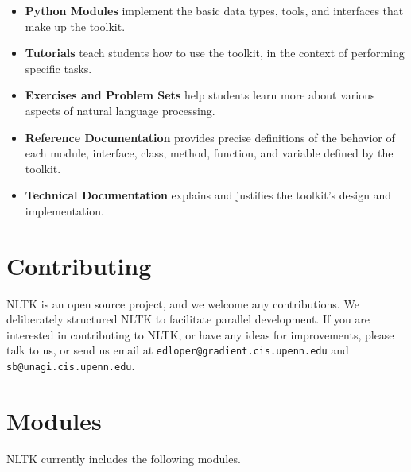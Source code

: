 \documentclass[12pt]{article}
\def\nogap{\setlength\itemsep{.0in}\setlength{\parskip}{0in}}
\begin{document}
\begin{itemize}\nogap
    \item \textbf{Python Modules} implement the basic data types,
      tools, and interfaces that make up the toolkit.

    \item \textbf{Tutorials} teach students how to use the toolkit, in the
      context of performing specific tasks.

    \item \textbf{Exercises and Problem Sets} help students learn more about
      various aspects of natural language processing.

    \item \textbf{Reference Documentation} provides precise definitions of the
      behavior of each module, interface, class, method, function, and
      variable defined by the toolkit.  

    \item \textbf{Technical Documentation} explains and justifies the
      toolkit's design and implementation. 
\end{itemize}

\section*{Contributing}
\thispagestyle{empty}

NLTK is an open source project, and we welcome any contributions.  We
deliberately structured NLTK to facilitate parallel development.  If
you are interested in contributing to NLTK, or have any ideas for
improvements, please talk to us, or send us email at
\texttt{edloper@gradient.cis.upenn.edu} and
\texttt{sb@unagi.cis.upenn.edu}.  

\section*{Modules}
\thispagestyle{empty}

NLTK currently includes the following modules.
\end{document}
